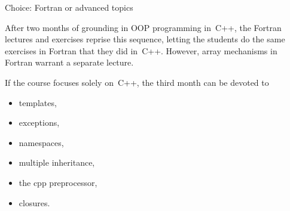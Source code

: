  {Choice: Fortran or advanced topics}

After two months of grounding in OOP programming in~C++, the Fortran
lectures and exercises reprise this sequence, letting the students do
the same exercises in Fortran that they did in~C++.  However, array
mechanisms in Fortran warrant a separate lecture.

If the course focuses solely on~C++, the third month can be devoted to
\begin{itemize}
\item templates,
\item exceptions,
\item namespaces,
\item multiple inheritance,
\item the cpp preprocessor,
\item closures.
\end{itemize}

